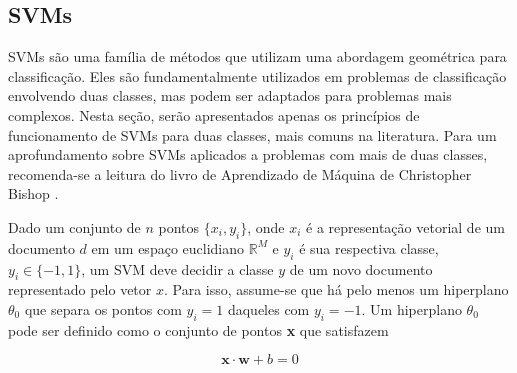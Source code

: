 
 
\subsection{SVMs}
\label{subsection:SVMs}

SVMs são uma família de métodos que utilizam uma abordagem geométrica para classificação. Eles são fundamentalmente utilizados em problemas de classificação envolvendo duas classes, mas podem ser adaptados para problemas mais complexos. Nesta seção, serão apresentados apenas os princípios de funcionamento de SVMs para duas classes, mais comuns na literatura. Para um aprofundamento sobre SVMs aplicados a problemas com mais de duas classes, recomenda-se a leitura do livro de Aprendizado de Máquina de Christopher Bishop \cite{bishop}.

Dado um conjunto de \ensuremath{n} pontos \ensuremath{\{x_i, y_i\}}, onde \ensuremath{x_i} é a representação vetorial de um documento \ensuremath{d} em um espaço euclidiano \ensuremath{\mathbb{R}^M} e \ensuremath{y_i} é sua respectiva classe, \ensuremath{y_i \in \{-1, 1\}}, um SVM deve decidir a classe \ensuremath{y} de um novo documento representado pelo vetor \ensuremath{x}. Para isso, assume-se que há pelo menos um hiperplano \ensuremath{\theta_0} que separa os pontos  com \ensuremath{y_i = 1} daqueles com \ensuremath{y_i = -1}. Um hiperplano \ensuremath{\theta_0} pode ser definido como o conjunto de pontos \textbf{x} que satisfazem

\begin{equation}
\label{function:svm}
\textbf{x} \ensuremath{\cdot} \textbf{w} + \ensuremath{b} = 0
\end{equation}

